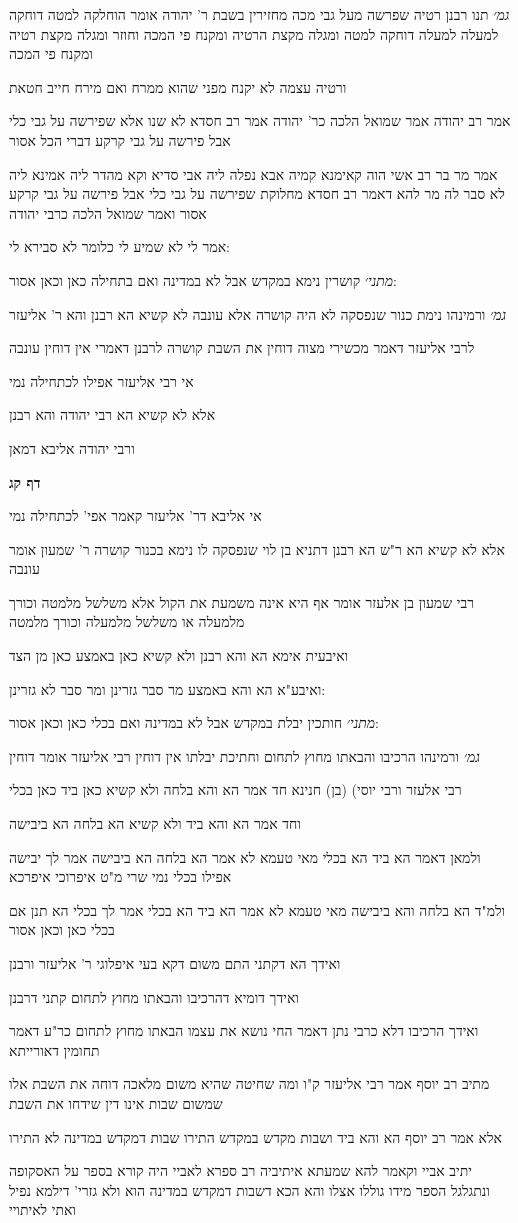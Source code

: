 \documentclass[12pt, openany]{book}
\newcommand{\sethebfont}{
\fontsize{10.5pt}{21.0pt} \selectfont
}
\newcommand{\textblock}[1]{
{\sethebfont #1\\}	
}
\newcommand{\sectname}{}
\newcommand{\newsection}[1]{
	\addcontentsline{toc}{section}{#1}
	\renewcommand{\sectname}{#1}	
	\vspace{-\baselineskip}
	\begin{center}
		\textbf{%
\fontsize{16pt}{16pt}\selectfont
			#1}
	\end{center}
	\vspace{-\baselineskip}
	\nopagebreak
}
\begin{document}
\textblock{{\large\emph{גמ׳}} תנו רבנן רטיה שפרשה מעל גבי מכה מחזירין בשבת ר' יהודה אומר הוחלקה למטה דוחקה למעלה למעלה דוחקה למטה ומגלה מקצת הרטיה ומקנח פי המכה וחוזר ומגלה מקצת רטיה ומקנח פי המכה}
\textblock{ורטיה עצמה לא יקנח מפני שהוא ממרח ואם מירח חייב חטאת}
\textblock{אמר רב יהודה אמר שמואל הלכה כר' יהודה אמר רב חסדא לא שנו אלא שפירשה על גבי כלי אבל פירשה על גבי קרקע דברי הכל אסור}
\textblock{אמר מר בר רב אשי הוה קאימנא קמיה אבא נפלה ליה אבי סדיא וקא מהדר ליה אמינא ליה לא סבר לה מר להא דאמר רב חסדא מחלוקת שפירשה על גבי כלי אבל פירשה על גבי קרקע אסור ואמר שמואל הלכה כרבי יהודה}
\textblock{אמר לי לא שמיע לי כלומר לא סבירא לי:}
\textblock{{\large\emph{מתני׳}} קושרין נימא במקדש אבל לא במדינה ואם בתחילה כאן וכאן אסור:}
\textblock{{\large\emph{גמ׳}} ורמינהו נימת כנור שנפסקה לא היה קושרה אלא עונבה לא קשיא הא רבנן והא ר' אליעזר}
\textblock{לרבי אליעזר דאמר מכשירי מצוה דוחין את השבת קושרה לרבנן דאמרי אין דוחין עונבה}
\textblock{אי רבי אליעזר אפילו לכתחילה נמי}
\textblock{אלא לא קשיא הא רבי יהודה והא רבנן}
\textblock{ורבי יהודה אליבא דמאן}
\newsection{דף קג}
\textblock{אי אליבא דר' אליעזר קאמר אפי' לכתחילה נמי}
\textblock{אלא לא קשיא הא ר"ש הא רבנן דתניא בן לוי שנפסקה לו נימא בכנור קושרה ר' שמעון אומר עונבה}
\textblock{רבי שמעון בן אלעזר אומר אף היא אינה משמעת את הקול אלא משלשל מלמטה וכורך מלמעלה או משלשל מלמעלה וכורך מלמטה}
\textblock{ואיבעית אימא הא והא רבנן ולא קשיא כאן באמצע כאן מן הצד}
\textblock{ואיבע"א הא והא באמצע מר סבר גזרינן ומר סבר לא גזרינן:}
\textblock{{\large\emph{מתני׳}} חותכין יבלת במקדש אבל לא במדינה ואם בכלי כאן וכאן אסור:}
\textblock{{\large\emph{גמ׳}} ורמינהו הרכיבו והבאתו מחוץ לתחום וחתיכת יבלתו אין דוחין רבי אליעזר אומר דוחין}
\textblock{רבי אלעזר ורבי יוסי) (בן) חנינא חד אמר הא והא בלחה ולא קשיא כאן ביד כאן בכלי}
\textblock{וחד אמר הא והא ביד ולא קשיא הא בלחה הא ביבישה}
\textblock{ולמאן דאמר הא ביד הא בכלי מאי טעמא לא אמר הא בלחה הא ביבישה אמר לך יבישה אפילו בכלי נמי שרי מ"ט איפרוכי איפרכא}
\textblock{ולמ"ד הא בלחה והא ביבישה מאי טעמא לא אמר הא ביד הא בכלי אמר לך בכלי הא תנן אם בכלי כאן וכאן אסור}
\textblock{ואידך הא דקתני התם משום דקא בעי איפלוגי ר' אליעזר ורבנן}
\textblock{ואידך דומיא דהרכיבו והבאתו מחוץ לתחום קתני דרבנן}
\textblock{ואידך הרכיבו דלא כרבי נתן דאמר החי נושא את עצמו הבאתו מחוץ לתחום כר"ע דאמר תחומין דאורייתא}
\textblock{מתיב רב יוסף אמר רבי אליעזר ק"ו ומה שחיטה שהיא משום מלאכה דוחה את השבת אלו שמשום שבות אינו דין שידחו את השבת}
\textblock{אלא אמר רב יוסף הא והא ביד ושבות מקדש במקדש התירו שבות דמקדש במדינה לא התירו}
\textblock{יתיב אביי וקאמר להא שמעתא איתיביה רב ספרא לאביי היה קורא בספר על האסקופה ונתגלגל הספר מידו גוללו אצלו והא הכא דשבות דמקדש במדינה הוא ולא גזרי' דילמא נפיל ואתי לאיתויי}
\end{document}
